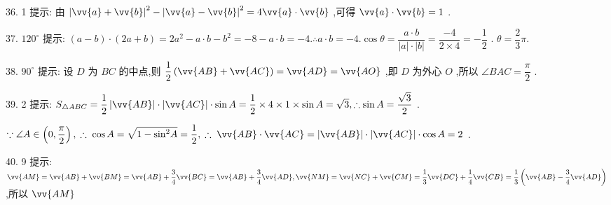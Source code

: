 36. 1 提示: 由 ${\left| \vv{a} + \vv{b}\right| }^{2} - {\left| \vv{a} - \vv{b}\right| }^{2} = 4\vv{a} \cdot  \vv{b}$ ,可得 $\vv{a} \cdot  \vv{b} = 1$ .

37. ${120}^{ \circ  }$ 提示: $\left( {a - b}\right)  \cdot  \left( {{2a} + b}\right)  = 2{a}^{2} - a \cdot  b - {b}^{2} =  - 8 - a \cdot  b =  - 4.\therefore a \cdot  b =  - 4.\cos \theta  = \dfrac{a \cdot  b}{\left| a\right|  \cdot  \left| b\right| } = \dfrac{-4}{2 \times  4} =  - \dfrac{1}{2}$ . $\theta  = \dfrac{2}{3}\pi .$

38. ${90}^{ \circ  }$ 提示: 设 $D$ 为 ${BC}$ 的中点,则 $\dfrac{1}{2}\left( {\vv{AB} + \vv{AC}}\right)  = \vv{AD} = \vv{AO}$ ,即 $D$ 为外心 $O$ ,所以 $\angle {BAC} = \dfrac{\pi }{2}$ .

39. 2 提示: ${S}_{\bigtriangleup {ABC}} = \dfrac{1}{2}\left| \vv{AB}\right|  \cdot  \left| \vv{AC}\right|  \cdot  \sin A = \dfrac{1}{2} \times  4 \times  1 \times  \sin A = \sqrt{3},\therefore \sin A = \dfrac{\sqrt{3}}{2}$ .

$\because \angle A \in  \left( {0,\dfrac{\pi }{2}}\right) ,\;\therefore \;\cos A = \sqrt{1 - {\sin }^{2}A} = \dfrac{1}{2},\;\therefore \;\vv{AB} \cdot  \vv{AC} = \left| \vv{AB}\right|  \cdot  \left| \vv{AC}\right|  \cdot  \cos A = 2$ .

40. 9 提示: $\vv{AM} = \vv{AB} + \vv{BM} = \vv{AB} + \dfrac{3}{4}\vv{BC} = \vv{AB} + \dfrac{3}{4}\vv{AD},\vv{NM} = \vv{NC} + \vv{CM} = \dfrac{1}{3}\vv{DC} + \dfrac{1}{4}\vv{CB} = \dfrac{1}{3}\left( {\vv{AB} - \dfrac{3}{4}\vv{AD}}\right)$ ,所以 $\vv{AM}$

